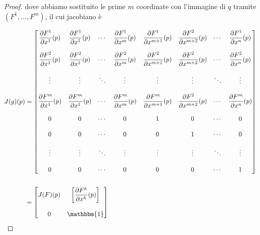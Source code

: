 \begin{proof}
	dove abbiamo sostituito le prime $ m $ coordinate con l'immagine di $ q $ tramite $ (F^{1},\dots,F^{m}) $, il cui jacobiano è
	
	\begin{align}
		\begin{split}
			J(g)(p) &= %
			\begin{bmatrix}
				\dfrac{\partial F^{1}}{\partial x^{1}} (p) & \dfrac{\partial F^{1}}{\partial x^{1}} (p) & \cdots & \dfrac{\partial F^{1}}{\partial x^{m}} (p) & \dfrac{\partial F^{1}}{\partial x^{m+1}} (p) & \dfrac{\partial F^{2}}{\partial x^{m+2}} (p) & \cdots & \dfrac{\partial F^{1}}{\partial x^{n}} (p) \\\\
				\dfrac{\partial F^{2}}{\partial x^{1}} (p) & \dfrac{\partial F^{2}}{\partial x^{1}} (p) & \cdots & \dfrac{\partial F^{2}}{\partial x^{m}} (p) & \dfrac{\partial F^{2}}{\partial x^{m+1}} (p) & \dfrac{\partial F^{2}}{\partial x^{m+2}} (p) & \cdots & \dfrac{\partial F^{2}}{\partial x^{n}} (p) \\\\
				\vdots & \vdots & \ddots & \vdots & \vdots & \vdots & \ddots & \vdots \\\\
				\dfrac{\partial F^{m}}{\partial x^{1}} (p) & \dfrac{\partial F^{m}}{\partial x^{1}} (p) & \cdots & \dfrac{\partial F^{m}}{\partial x^{m}} (p) & \dfrac{\partial F^{m}}{\partial x^{m+1}} (p) & \dfrac{\partial F^{2}}{\partial x^{m+2}} (p) & \cdots & \dfrac{\partial F^{m}}{\partial x^{n}} (p) \\\\
				0 & 0 & \cdots & 0 & 1 & 0 & \cdots & 0 \\\\
				0 & 0 & \cdots & 0 & 0 & 1 & \cdots & 0 \\\\
				\vdots & \vdots & \ddots & \vdots & \vdots & \vdots & \ddots & \vdots \\\\
				0 & 0 & \cdots & 0 & 0 & 0 & \cdots & 1
			\end{bmatrix}\\\\%
			&= %
			\begin{bmatrix}
				J(F)(p) & \left[ \dfrac{\partial F^{k}}{\partial x^{h}} (p) \right] \\\\
				0 & \mathbbm{1}
			\end{bmatrix}
		\end{split}
	\end{align}


\end{proof}
